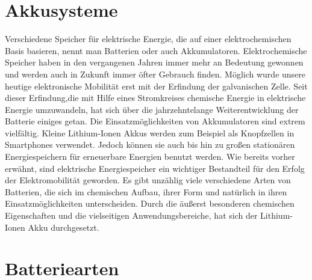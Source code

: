 
\section{Akkusysteme}
Verschiedene Speicher für elektrische Energie, die auf einer elektrochemischen Basis basieren, nennt man Batterien oder auch Akkumulatoren. Elektrochemische Speicher haben in den vergangenen Jahren immer mehr an Bedeutung gewonnen und werden auch in Zukunft immer öfter Gebrauch finden. Möglich wurde unsere heutige elektronische Mobilität erst mit der Erfindung der galvanischen Zelle. Seit dieser Erfindung,die mit Hilfe eines Stromkreises chemische Energie in elektrische Energie umzuwandeln, hat sich über die jahrzehntelange Weiterentwicklung der Batterie einiges getan. Die Einsatzmöglichkeiten von Akkumulatoren sind extrem vielfältig. Kleine Lithium-Ionen Akkus werden zum Beispiel als Knopfzellen in Smartphones verwendet. Jedoch können sie auch bis hin zu großen stationären Energiespeichern für erneuerbare Energien benutzt werden. Wie bereits vorher erwähnt, sind elektrische Energiespeicher ein wichtiger Bestandteil für den Erfolg der Elektromobilität geworden. Es gibt unzählig viele verschiedene Arten von Batterien, die sich im chemischen Aufbau, ihrer Form und natürlich in ihren Einsatzmöglichkeiten unterscheiden. Durch die äußerst besonderen chemischen Eigenschaften und die vielseitigen Anwendungsbereiche, hat sich der Lithium-Ionen Akku durchgesetzt.
\newpage

\section{Batteriearten}

